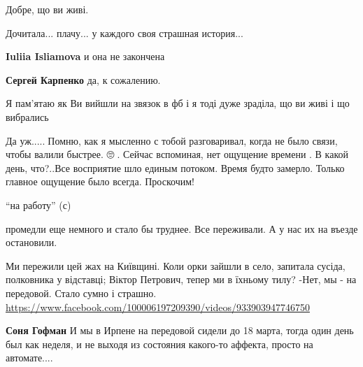  
 
 
 
 

\qqSecCmt


Добре, що ви живі.


Дочитала... плачу... у каждого своя страшная история...

\begin{itemize} %
\textbf{Iuliia Isliamova} и она не закончена

\textbf{Сергей Карпенко} да, к сожалению.
\end{itemize} %


Я пам'ятаю як Ви вийшли на звязок в фб і я тоді дуже зраділа, що ви живі і що вибрались🙏


Да уж.....🤨Помню, как я мысленно с тобой разговаривал, когда не было связи,
чтобы валили быстрее. 🙄🤔. Сейчас вспоминая, нет ощущение времени . В какой
день, что?..Все восприятие шло единым потоком. Время будто замерло. Только
главное ощущение было всегда. Проскочим! 🙌


\enquote{на работу} (с)

промедли еще немного и стало бы труднее. Все переживали. А у нас их на въезде
остановили.


Ми пережили цей жах на Київщині. Коли орки зайшли в село, запитала сусіда,
полковника у відставці; Віктор Петрович, тепер ми в їхньому тилу? -Нет, мы - на
передовой. Стало сумно і страшно.
\url{https://www.facebook.com/100006197209390/videos/933903947746750}

\begin{itemize} %
\textbf{Соня Гофман} И мы в Ирпене на передовой сидели до 18 марта, тогда один день был как неделя, и не выходя из состояния какого-то аффекта, просто на автомате....
\end{itemize} %

